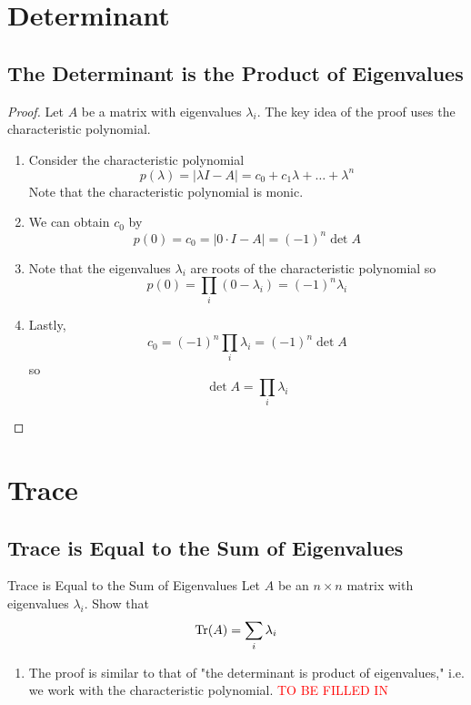 \documentclass[../main]{subfiles}
\begin{document}
\section{Determinant}
\subsection{The Determinant is the Product of Eigenvalues}
\begin{proof}
    Let $A$ be a matrix with eigenvalues $\lambda_i$. The key idea of the proof uses the characteristic polynomial.
    \begin{enumerate}
        \item Consider the characteristic polynomial
        \[
        p(\lambda) = |\lambda I - A| = c_0 + c_1 \lambda + \dots + \lambda^n
        \]
        Note that the characteristic polynomial is monic.
        \item We can obtain $c_0$ by
        \[
        p(0) = c_0 = |0\cdot I - A| = (-1)^n \det A
        \]
        \item Note that the eigenvalues $\lambda_i$ are roots of the characteristic polynomial so 
        \[
        p(0) = \prod_i(0-\lambda_i) = (-1)^n \lambda_i
        \]
        \item Lastly, 
        \[
        c_0 = (-1)^n \prod_{i}\lambda_i  = (-1)^n \det A
        \]
        so 
        \[
        \det A = \prod_i \lambda_i
        \]
    \end{enumerate}
\end{proof}
\section{Trace}
\subsection{Trace is Equal to the Sum of Eigenvalues}
\begin{bbox}{Trace is Equal to the Sum of Eigenvalues}
    Let $A$ be an $n\times n$ matrix with eigenvalues $\lambda_i$. Show that 
    \[
    \Tr(A) = \sum_i \lambda_i
    \]
\end{bbox}
\begin{solution}
    \begin{enumerate}
        \item The proof is similar to that of "the determinant is product of eigenvalues," i.e. we work with the characteristic polynomial. \textcolor{red}{TO BE FILLED IN} 
    \end{enumerate}
\end{solution}
\end{document}
